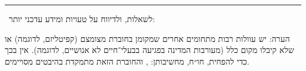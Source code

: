 \vfill

\hrule

~\hfill לשאלות, ולדיווח על טעויות ומידע עדכני יותר: \hfill~

\small הערה: יש עוולות רבות מתחומים אחרים שמקומן בחוברת מצומצם (קפיטליזם, לדוגמה) או שלא קיבלו מקום כלל (מעורבות המדינה בפגיעה בבעלי־חיים לא אנושיים, לדוגמה). אין בכך כדי להפחית, חו״ח, מחשיבותן: , והחוברת הזאת מתמקדת בהיבטים מסויימים.
